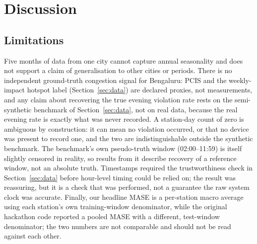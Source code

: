 \section{Discussion}

\subsection{Limitations}
\label{sec:limitations}

Five months of data from one city cannot capture annual seasonality and does not support a claim
of generalisation to other cities or periods. There is no independent ground-truth congestion
signal for Bengaluru: PCIS and the weekly-impact hotspot label (Section~\ref{sec:data}) are
declared proxies, not measurements, and any claim about recovering the true evening violation
rate rests on the semi-synthetic benchmark of Section~\ref{sec:data}, not on real data, because
the real evening rate is exactly what was never recorded. A station-day count of zero is
ambiguous by construction: it can mean no violation occurred, or that no device was present to
record one, and the two are indistinguishable outside the synthetic benchmark. The benchmark's
own pseudo-truth window (02:00--11:59) is itself slightly censored in reality, so results from it
describe recovery of a reference window, not an absolute truth. Timestamps required the
trustworthiness check in Section~\ref{sec:data} before hour-level timing could be relied on; the
result was reassuring, but it is a check that was performed, not a guarantee the raw system clock
was accurate. Finally, our headline MASE is a per-station macro average using each station's own
training-window denominator, while the original hackathon code reported a pooled MASE with a
different, test-window denominator; the two numbers are not comparable and should not be read
against each other.
